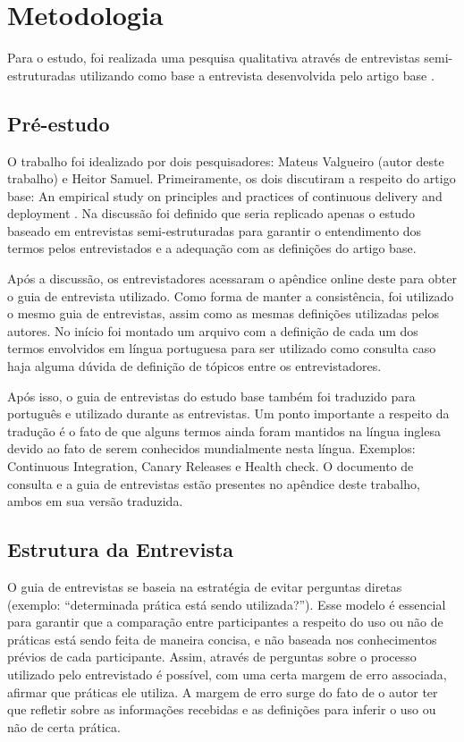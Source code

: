 
\chapter{Metodologia}

Para o estudo, foi realizada uma pesquisa qualitativa através de entrevistas semi-estruturadas utilizando como base a entrevista desenvolvida pelo artigo base \cite{empiricalStudy2016}.


\section{Pré-estudo}

O trabalho foi idealizado por dois pesquisadores: Mateus Valgueiro (autor deste trabalho) e Heitor Samuel. Primeiramente, os dois discutiram a respeito do artigo base: An empirical study on principles and practices of continuous delivery and deployment \cite{empiricalStudy2016}. Na discussão foi definido que seria replicado apenas o estudo baseado em entrevistas semi-estruturadas para garantir o entendimento dos termos pelos entrevistados e a adequação com as definições do artigo base. 

Após a discussão, os entrevistadores acessaram o apêndice online deste para obter o guia de entrevista utilizado. Como forma de manter a consistência, foi utilizado o mesmo guia de entrevistas, assim como as mesmas definições utilizadas pelos autores. No início foi montado um arquivo com a definição de cada um dos termos envolvidos em língua portuguesa para ser utilizado como consulta caso haja alguma dúvida de definição de tópicos entre os entrevistadores.

Após isso, o guia de entrevistas do estudo base também foi traduzido para português e utilizado durante as entrevistas. Um ponto importante a respeito da tradução é o fato de que alguns termos ainda foram mantidos na língua inglesa devido ao fato de serem conhecidos mundialmente nesta língua. Exemplos: Continuous Integration, Canary Releases e Health check.
O documento de consulta e a guia de entrevistas estão presentes no apêndice deste trabalho, ambos em sua versão traduzida.


\section{Estrutura da Entrevista}

O guia de entrevistas se baseia na estratégia de evitar perguntas diretas (exemplo: “determinada prática está sendo utilizada?”). Esse modelo é essencial para garantir que a comparação entre participantes a respeito do uso ou não de práticas está sendo feita de maneira concisa, e não baseada nos conhecimentos prévios de cada participante. Assim, através de perguntas sobre o processo utilizado pelo entrevistado é possível, com uma certa margem de erro associada, afirmar que práticas ele utiliza. A margem de erro surge do fato de o autor ter que refletir sobre as informações recebidas e as definições para inferir o uso ou não de certa prática.

